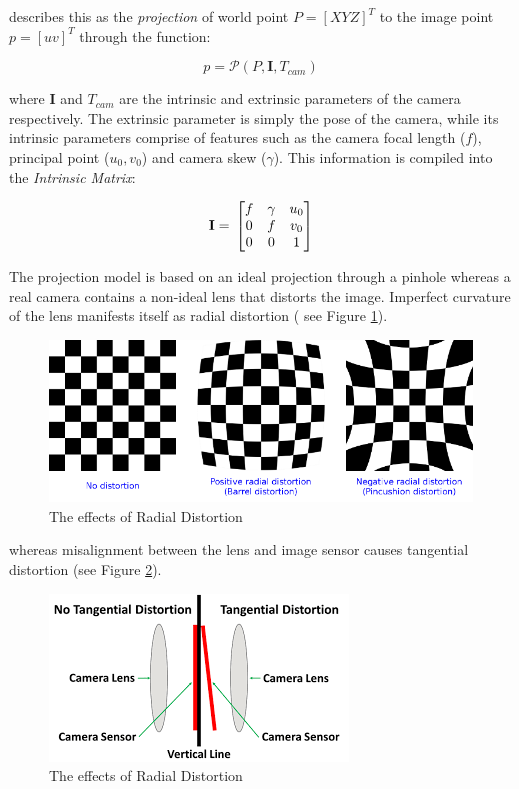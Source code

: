\documentclass{UoNMCHA}
\numberwithin{equation}{section}
\begin{document}
\cite{zhang} describes this as the \textit{projection} of world point $P = [X Y Z]^{T}$ to the image point $p = [u v]^T$ through the function:

\begin{equation}\label{eqn:projectionequation}
p = \mathscr{P}(P,\mathbf{I},T_{cam})
\end{equation}

where $\mathbf{I}$ and $T_{cam}$ are the intrinsic and extrinsic parameters of the camera respectively. The extrinsic parameter is simply the pose of the camera, while its intrinsic parameters comprise of features such as the camera focal length ($f$), principal point ($u_0,v_0$) and camera skew ($\gamma$). This information is compiled into the \textit{Intrinsic Matrix}:

\begin{equation}
\mathbf{I} = \\
\begin{bmatrix}
f & \gamma & u_0 \\
0 & f & v_0 \\
0 & 0& 1
\end{bmatrix}
\end{equation} 

The projection model is based on an ideal projection through a pinhole whereas a real camera contains a non-ideal lens that distorts the image. Imperfect curvature of the lens manifests itself as radial distortion ( see Figure \ref{fig:RadialDistortion}).

\begin{figure}[H]
	\begin{center}
		\includegraphics[width=.8\linewidth]{Figures/RadialDistortion}
		\caption{The effects of Radial Distortion}
		\label{fig:RadialDistortion}
	\end{center}
\end{figure}

whereas misalignment between the lens and image sensor causes tangential distortion (see Figure \ref{fig:TangentialDistortion}).

\begin{figure}[H]
	\begin{center}
		\includegraphics[width=.5\linewidth]{Figures/TangentialDistortion}
		\caption{The effects of Radial Distortion}
		\label{fig:TangentialDistortion}
	\end{center}
\end{figure}
\end{document}
